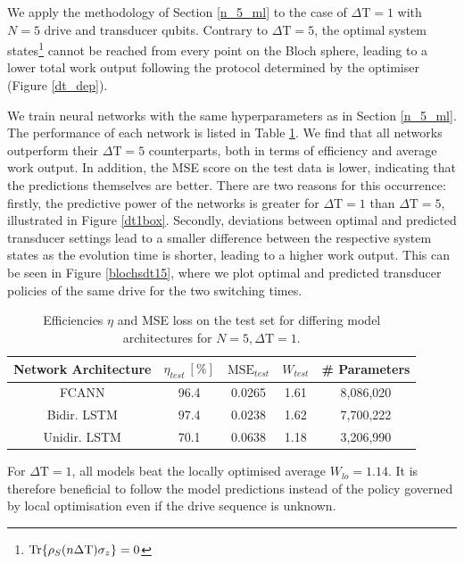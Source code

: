 We apply the methodology of Section \ref{n_5_ml} to the case of $\Delta \mathrm{T} = 1$ with $N=5$ drive and transducer qubits.
Contrary to $\Delta \mathrm{T} = 5$, the optimal system states\footnote{$\Tr{\rho_S(n \Delta \mathrm{T}) \sigma_z} = 0$} cannot be reached from every point on the Bloch sphere, leading to a lower total work output following the protocol determined by the optimiser (Figure \ref{dt_dep}).

We train neural networks with the same hyperparameters as in Section \ref{n_5_ml}.
The performance of each network is listed in Table \ref{effdt1}.
We find that all networks outperform their $\Delta \mathrm{T} = 5$ counterparts, both in terms of efficiency and average work output.
In addition, the MSE score on the test data is lower, indicating that the predictions themselves are better.
There are two reasons for this occurrence: firstly, the predictive power of the networks is greater for $\Delta \mathrm{T} = 1$ than $\Delta \mathrm{T} = 5$, illustrated in Figure \ref{dt1box}.
Secondly, deviations between optimal and predicted transducer settings lead to a smaller difference between the respective system states as the evolution time is shorter, leading to a higher work output.
This can be seen in Figure \ref{blochsdt15}, where we plot optimal and predicted transducer policies of the same drive for the two switching times.

\begin{table}[h]
	\centering
	\begin{tabular}{ c | c | c | c | c }
		Network Architecture & $\eta_{test} \ [\%]$ & $\mathrm{MSE}_{test}$  & $W_{test}$ & \# Parameters \\
		\hline
		FCANN        & 96.4 & 0.0265 & 1.61 & 8,086,020 \\
		Bidir. LSTM  & 97.4 & 0.0238 & 1.62 & 7,700,222 \\
		Unidir. LSTM & 70.1 & 0.0638 & 1.18 & 3,206,990 \\
	\end{tabular}
	\caption{Efficiencies $\eta$ and MSE loss on the test set for differing model architectures for $N=5, \Delta \mathrm{T} = 1$.}
	\label{effdt1}
\end{table}

For $\Delta \mathrm{T} = 1$, all models beat the locally optimised average $W_{lo} = 1.14$.
It is therefore beneficial to follow the model predictions instead of the policy governed by local optimisation even if the drive sequence is unknown.

